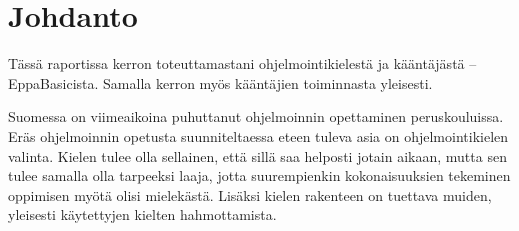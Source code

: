 
\section{Johdanto}
\begin{comment}
Tietokoneet ymmärtävät konekieltä.
Konekieli muodostuu yksinkertaisisista komennoista,
joiden nopeaan suorittamiseen tietokoneet on suunniteltu.
Ihmiset ovat kuitenkin huonoja kirjoittamaan konekieltä
sen alkukantaisten komentojen vuoksi.
Ihmisiä varten onkin kehitelty erilaisia ohjelmointikieliä,
jotka sisältävät erilaisia abstraktioita ohjelmoinnin helpottamiseksi.

Muunnos ohjelmointikielestä konekieleen ei kuitenkaan aina ole yksinkertainen.
Monet ohjelmointikielten abstraktiot voidaan toteuttaa hyvinkin eri tavoin konekielessä,
sillä eri tietokonearkkitehtuurit sisältävät hyvinkin erilaisia konekielisiä komentoja.
Lisäksi lyhyistäkin ohjelmakoodinpätkistä voi syntyä pitkiä konekielisiä ohjelmia,
joten pientenkin ohjelmien muuttaminen konekieleksi voi viedä ohjelmoijalta tunteja.

Tämän prosessin automatisoimiseksi on kehitetty ohjelmia, joita kutsutaan kääntäjiksi.
Kääntäjä on yksinkertaisesti ohjelma, joka muuttaa koodia muodosta toiseen.
Usein tämä tarkoittaa ohjelmointikielen muuttamista konekieleksi,
mutta on myös olemassa kääntäjiä,
jotka kääntävät ohjelmointikieliä toisikseen.
Tällaisia kääntäjiä kutsutaan source-to-source-kääntäjiksi.
\end{comment}

Tässä raportissa kerron toteuttamastani
ohjelmointikielestä ja kääntäjästä -- EppaBasicista.
Samalla kerron myös kääntäjien toiminnasta yleisesti.



Suomessa on viimeaikoina puhuttanut ohjelmoinnin
opettaminen peruskouluissa.
Eräs ohjelmoinnin opetusta suunniteltaessa eteen tuleva
asia on ohjelmointikielen valinta.
Kielen tulee olla sellainen,
että sillä saa helposti jotain aikaan,
mutta sen tulee samalla olla tarpeeksi laaja,
jotta suurempienkin kokonaisuuksien tekeminen
oppimisen myötä olisi mielekästä.
Lisäksi kielen rakenteen on tuettava muiden,
yleisesti käytettyjen kielten hahmottamista.


